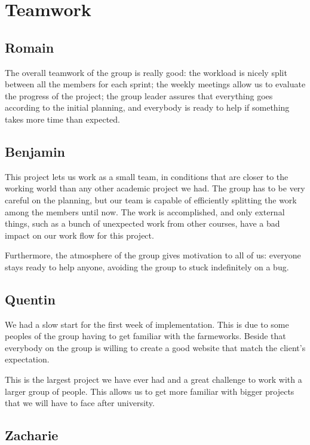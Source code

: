\section{Teamwork}

\subsection{Romain}
The overall teamwork of the group is really good: the workload is nicely
split between all the members for each sprint; the weekly meetings allow
us to evaluate the progress of the project; the group leader assures that
everything goes according to the initial planning, and everybody is ready to
help if something takes more time than expected. \newline

\subsection{Benjamin}

This project lets us work as a small team, in conditions that are closer to the working world than any other academic project we had. The group has to be very careful on the planning, but our team is capable of efficiently splitting the work among the members until now. The work is accomplished, and only external things, such as a bunch of unexpected work from other courses, have a bad impact on our work flow for this project. \newline

Furthermore, the atmosphere of the group gives motivation to all of us: everyone stays ready to help anyone, avoiding the group to stuck indefinitely on a bug.

\subsection{Quentin}
We had a slow start for the first week of implementation. This is due to some peoples of the group having to get familiar with the farmeworks. Beside that everybody on the group is willing to create a good website that match the client's expectation.

This is the largest project we have ever had and a great challenge to work with a larger group of people. This allows us to get more familiar with bigger projects that we will have to face after university. 


\subsection{Zacharie}
